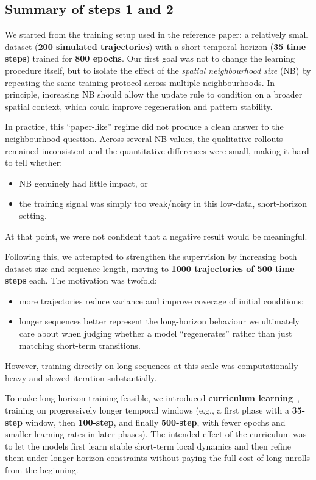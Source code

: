\subsection{Summary of steps 1 and 2}

We started from the training setup used in the reference paper: a relatively small dataset (\textbf{200 simulated trajectories}) with a short temporal horizon (\textbf{35 time steps}) trained for \textbf{800 epochs}.
Our first goal was not to change the learning procedure itself, but to isolate the effect of the \emph{spatial neighbourhood size} (NB) by repeating the same training protocol across multiple neighbourhoods.
In principle, increasing NB should allow the update rule to condition on a broader spatial context, which could improve regeneration and pattern stability.

In practice, this ``paper-like'' regime did not produce a clean answer to the neighbourhood question.
Across several NB values, the qualitative rollouts remained inconsistent and the quantitative differences were small, making it hard to tell whether:
\begin{itemize}
  \item NB genuinely had little impact, or
  \item the training signal was simply too weak/noisy in this low-data, short-horizon setting.
\end{itemize}
At that point, we were not confident that a negative result would be meaningful.

Following this, we attempted to strengthen the supervision by increasing both dataset size and sequence length, moving to \textbf{1000 trajectories of 500 time steps} each.
The motivation was twofold:
\begin{itemize}
  \item more trajectories reduce variance and improve coverage of initial conditions;
  \item longer sequences better represent the long-horizon behaviour we ultimately care about when judging whether a model ``regenerates'' rather than just matching short-term transitions.
\end{itemize}
However, training directly on long sequences at this scale was computationally heavy and slowed iteration substantially.

To make long-horizon training feasible, we introduced \textbf{curriculum learning}~\cite{bengio2009curriculum}, training on progressively longer temporal windows (e.g., a first phase with a \textbf{35-step} window, then \textbf{100-step}, and finally \textbf{500-step}, with fewer epochs and smaller learning rates in later phases).
The intended effect of the curriculum was to let the models first learn stable short-term local dynamics and then refine them under longer-horizon constraints without paying the full cost of long unrolls from the beginning.

